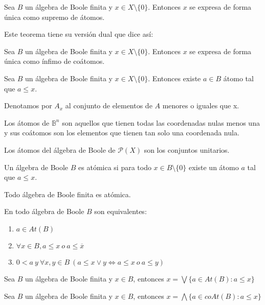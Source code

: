 \begin{nth}
    Sea $B$ un álgebra de Boole finita y $x \in X \setminus \{0\}$. Entonces $x$ se expresa de forma única como supremo de átomos.
\end{nth}
Este teorema tiene su versión dual que dice así:
\begin{nth}
    Sea $B$ un álgebra de Boole finita y $x \in X \setminus \{0\}$. Entonces $x$ se expresa de forma única como ínfimo de coátomos.
\end{nth}

\begin{lema}
    Sea $B$ un álgebra de Boole finita y $x \in X \setminus \{0\}$. Entonces existe $a \in B$ átomo tal que $a \leq x$.
\end{lema}
\begin{nota}
    Denotamos por $A_x$ al conjunto de elementos de $A$ menores o iguales que x.
\end{nota}

\begin{ejemplo}
    Los átomos de $\mathbb{B}^n$ son aquellos que tienen todas las coordenadas nulas menos una y sus coátomos son los elementos que tienen tan solo una coordenada nula.
\end{ejemplo}
\begin{ejemplo}
    Los átomos del álgebra de Boole de $\mathcal{P}(X)$ son los conjuntos unitarios.
\end{ejemplo}

\begin{ndef}
    Un álgebra de Boole $B$ es atómica si para todo $x \in B \setminus \{0\}$ existe un átomo $a$ tal que $a \leq x$.
\end{ndef}
\begin{nth}
    Todo álgebra de Boole finita es atómica.
\end{nth}
\begin{nth}
    En todo álgebra de Boole $B$ son equivalentes:
    \begin{enumerate}
        \item $a \in At(B)$
        \item $\forall x \in B, a \leq x \ o \ a \leq \overline{x}$
        \item $0 < a \ y \ \forall x,y \in B \ (a \leq x \lor y \Leftrightarrow a \leq x \ o \ a \leq y)$
    \end{enumerate}
\end{nth}
\begin{nth}
    Sea $B$ un álgebra de Boole finita  y $x \in B$, entonces $x = \bigvee \{a \in At(B): a \leq x\}$
\end{nth}
\begin{nth}
    Sea $B$ un álgebra de Boole finita  y $x \in B$, entonces $x = \bigwedge \{a \in coAt(B): a \leq x\}$
\end{nth}

